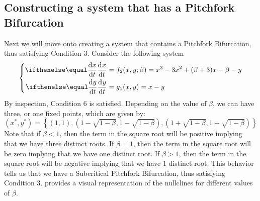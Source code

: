 \subsection{Constructing a system that has a Pitchfork Bifurcation}\label{subsec:constructing-a-system-that-has-a-pitchfork-bifurcation}
Next we will move onto creating a system that contains a Pitchfork Bifurcation, thus satisfying Condition 3. Consider the following system
\begin{equation*}
    \begin{dcases}
        \begin{aligned}
            \diff[]{x}{t} &= f_2(x,y;\beta) = x^3-3x^2+(\beta+3)x-\beta-y\\
            \diff[]{y}{t} &= g_1(x,y) = x-y
        \end{aligned}
    \end{dcases}
\end{equation*}
By inspection, Condition 6 is satisfied. Depending on the value of $\beta$, we can have three, or one fixed points, which are given by:
\begin{equation*}
    \left(x^*,y^*\right) = \left\{\left(1, 1\right), \left(1-\sqrt{1-\beta}, 1-\sqrt{1-\beta}\right), \left(1+\sqrt{1-\beta}, 1+\sqrt{1-\beta}\right)\right\}
\end{equation*}
Note that if $\beta<1$, then the term in the square root will be positive implying that we have three distinct roots. If $\beta=1$, then the term in the square root will be zero implying that we have one distinct root. If $\beta>1$, then the term in the square root will be negative implying that we have 1 distinct root. This behavior tells us that we have a Subcritical Pitchfork Bifurcation, thus satisfying Condition 3.  provides a visual representation of the nullclines for different values of $\beta$.

